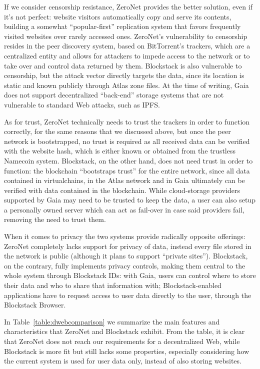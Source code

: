 \documentclass[mscthesis]{usiinfthesis}
\begin{document}
If we consider censorship resistance, ZeroNet provides the better solution, even if it's not perfect: website visitors automatically copy and serve its contents, building a somewhat ``popular-first'' replication system that favors frequently visited websites over rarely accessed ones. ZeroNet's vulnerability to censorship resides in the peer discovery system, based on BitTorrent's trackers, which are a centralized entity and allows for attackers to impede access to the network or to take over and control data returned by them. Blockstack is also vulnerable to censorship, but the attack vector directly targets the data,
since its location is static and known publicly through Atlas zone files. At the time of writing, Gaia does not support decentralized ``back-end'' storage systems that are not vulnerable to standard Web attacks, such as IPFS.

As for trust, ZeroNet technically needs to trust the trackers in order to function correctly, for the same reasons that we discussed above, but once the peer network is bootstrapped, no trust is required as all received data can be verified with the website hash, which is either known or obtained from the trustless Namecoin system. Blockstack, on the other hand, does not need trust in order to function: the blockchain ``bootstraps trust'' for the entire network, since all data contained in virtualchains, in the Atlas network and in Gaia ultimately can be verified with data contained in the blockchain. While cloud-storage providers supported by Gaia may need to be trusted to keep the data, a user can also setup a personally owned server which can act as fail-over in case said providers fail, removing the need to trust them.

When it comes to privacy the two systems provide radically opposite offerings: ZeroNet completely lacks support for privacy of data, instead every file stored in the network is public (although it plans to support ``private sites''). Blockstack, on the contrary, fully implements privacy controls, making them central to the whole system through Blockstack IDs: with Gaia, users can control where to store their data and who to share that information with; Blockstack-enabled applications have to request access to user data directly to the user, through the Blockstack Browser.

In Table~\ref{table:dwebcomparison} we summarize the main features and characteristics that ZeroNet and Blockstack exhibit. From the table, it is clear that ZeroNet does not reach our requirements for a decentralized Web, while Blockstack is more fit but still lacks some properties, especially considering how the current system is used for user data only, instead of also storing websites.
\end{document}
